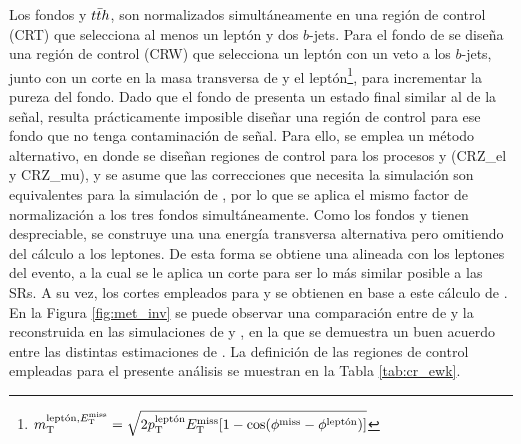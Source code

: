 Los fondos \ttbarph y $t\bar{t} h$, son normalizados simultáneamente en una región de control (CRT) que selecciona al menos un leptón y dos $b$-jets. Para el fondo de \wph se diseña una región de control (CRW) que selecciona un leptón con un veto a los $b$-jets, junto con un corte en la masa transversa de \met y el leptón\footnote{$m_{\text{T}}^{\text{leptón}, E_{\text{T}}^{\text{miss}}} = \sqrt{2p_{\text{T}}^{\text{leptón}}E_{\text{T}}^{\text{miss}}[1-\cos(\phi^{\text{miss}}-\phi^{\text{leptón}})]}$}, para incrementar la pureza del fondo. Dado que el fondo de \znunuph presenta un estado final similar al de la señal, resulta prácticamente imposible diseñar una región de control para ese fondo que no tenga contaminación de señal. Para ello, se emplea un método alternativo, en donde se diseñan regiones de control para los procesos \zeeph y \zmumuph (CRZ\_el y CRZ\_mu), y se asume que las correcciones que necesita la simulación son equivalentes para la simulación de \znunuph, por lo que se aplica el mismo factor de normalización a los tres fondos simultáneamente. Como los fondos \zeeph y \zmumuph tienen \met despreciable, se construye una una energía transversa alternativa pero omitiendo del cálculo a los leptones. De esta forma se obtiene una \met alineada con los leptones del evento, a la cual se le aplica un corte para ser lo más similar posible a las SRs. A su vez, los cortes empleados para \dphijetmet y \dphigammet se obtienen en base a este cálculo de \met. En la Figura \ref{fig:met_inv} se puede observar una comparación entre \met de \znunuph y la reconstruida en las simulaciones de \zeeph y \zmumuph, en la que se demuestra un buen acuerdo entre las distintas estimaciones de \met. La definición de las regiones de control empleadas para el presente análisis se muestran en la Tabla \ref{tab:cr_ewk}.

